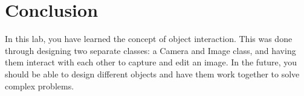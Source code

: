 \section{Conclusion}

In this lab, you have learned the concept of object interaction. This was done through designing two separate classes: a Camera and Image class, and having them interact with each other to capture and edit an image. In the future, you should be able to design different objects and have them work together to solve complex problems.
